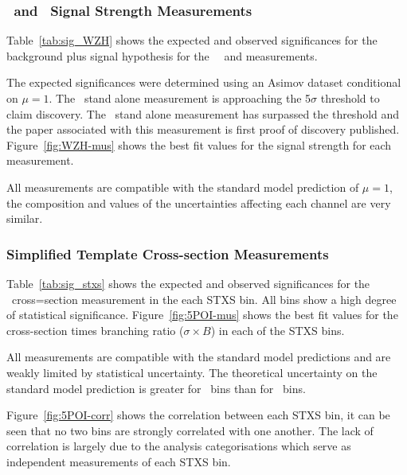 \subsubsection{\WH\ and \ZH\ Signal Strength Measurements}
Table~\ref{tab:sig_WZH} shows the expected and observed significances for
the background plus signal hypothesis for the \WH\, \ZH\ and \VH measurements.

The expected significances were determined using an Asimov dataset conditional
on $\mu=1$. The \WH\ stand alone measurement is approaching the 5$\sigma$
threshold to claim discovery. The \ZH\ stand alone measurement has surpassed the
threshold and the paper associated with this measurement is first proof of
discovery published. Figure~\ref{fig:WZH-mus}
shows the best fit values for the signal strength for each measurement.

All measurements are compatible with the standard model prediction of $\mu=1$,
the composition and values of the uncertainties affecting each channel are very
similar.
\clearpage

\subsubsection{Simplified Template Cross-section Measurements}
Table~\ref{tab:sig_stxs} shows the expected and observed significances for
the \VHbb\ cross=section measurement in the each STXS bin. All bins show a high
degree of statistical significance. Figure~\ref{fig:5POI-mus} shows the best fit
values for the cross-section times branching ratio ($\sigma \times B$) in each
of the STXS bins.

All measurements are compatible with the standard model predictions and are
weakly limited by statistical uncertainty. The theoretical uncertainty on the
standard  model prediction is greater for \ZH\ bins than for \WH\ bins.

Figure~\ref{fig:5POI-corr} shows the correlation between each STXS bin, it can
be seen that no two bins are strongly correlated with one another. The lack of
correlation is largely due to the analysis categorisations which serve as
independent measurements of each STXS bin.



